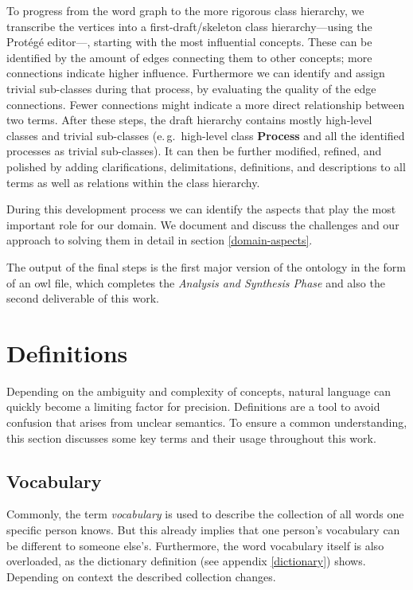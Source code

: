 \documentclass[a4paper, DIV=13, BCOR=0cm]{scrbook}
\newcommand{\eg}{e.\,g.\ }
\begin{document}
To progress from the word graph to the more rigorous class hierarchy, we transcribe the vertices into a first-draft/skeleton class hierarchy---using the Protégé editor---, starting with the most influential concepts. These can be identified by the amount of edges connecting them to other concepts; more connections indicate higher influence. Furthermore we can identify and assign trivial sub-classes during that process, by evaluating the quality of the edge connections. Fewer connections might indicate a more direct relationship between two terms. After these steps, the draft hierarchy contains mostly high-level classes and trivial sub-classes (\eg high-level class \textbf{Process} and all the identified processes as trivial sub-classes). It can then be further modified, refined, and polished by adding clarifications, delimitations, definitions, and descriptions to all terms as well as relations within the class hierarchy.

During this development process we can identify the aspects that play the most important role for our domain. We document and discuss the challenges and our approach to solving them in detail in section \ref{domain-aspects}.

The output of the final steps is the first major version of the ontology in the form of an \gls{owl} file, which completes the \textit{Analysis and Synthesis Phase} and also the second deliverable of this work.

\section{Definitions }
Depending on the ambiguity and complexity of concepts, natural language can quickly become a limiting factor for precision. Definitions are a tool to avoid confusion that arises from unclear semantics. To ensure a common understanding, this section discusses some key terms and their usage throughout this work.

\subsection{Vocabulary}
\label{vocabulary}
Commonly, the term \textit{vocabulary} is used to describe the collection of all words one specific person knows. But this already implies that one person's vocabulary can be different to someone else's. Furthermore, the word vocabulary itself is also overloaded, as the dictionary definition (see appendix \ref{dictionary}) shows. Depending on context the described collection changes. \cite{mw-dictionary}
\end{document}
